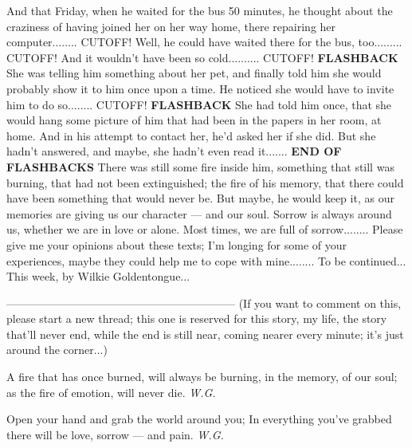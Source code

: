 And that Friday, when he waited for the bus 50 minutes, he thought about the craziness of having joined her on her way home, there repairing her computer........
CUTOFF!
Well, he could have waited there for the bus, too.........
CUTOFF!
And it wouldn't have been so cold..........
CUTOFF!
\textbf{FLASHBACK}
She was telling him something about her pet, and finally told him she would probably show it to him once upon a time. 
He noticed she would have to invite him to do so........
CUTOFF!
\textbf{FLASHBACK}
She had told him once, that she would hang some picture of him that had been in the papers in her room, at home. 
And in his attempt to contact her, he'd asked her if she did. 
But she hadn't answered, and maybe, she hadn't even read it.......
\textbf{END OF FLASHBACKS}
There was still some fire inside him, something that still was burning, that had not been extinguished; the fire of his memory, that there could have been something that would never be. 
But maybe, he would keep it, as our memories are giving us our character --- and our soul. 
Sorrow is always around us, whether we are in love or alone. 
Most times, we are full of sorrow........
Please give me your opinions about these texts; I'm longing for some of your experiences, maybe they could help me to cope with mine........
To be continued...
This week, by Wilkie Goldentongue...

--------------------------------------------------------------
(If you want to comment on this, please start a new thread; this one is reserved for this story, my life, the story that'll never end, while the end is still near, coming nearer every minute; it's just around the corner...)

A fire that has once burned, 
will always be burning, 
in the memory, 
of our soul; 
as the fire of emotion, 
will never die. 
\emph{W.G.}

Open your hand 
and grab the world around you; 
In everything you've grabbed 
there will be love, 
sorrow --- and pain. 
\emph{W.G.}

